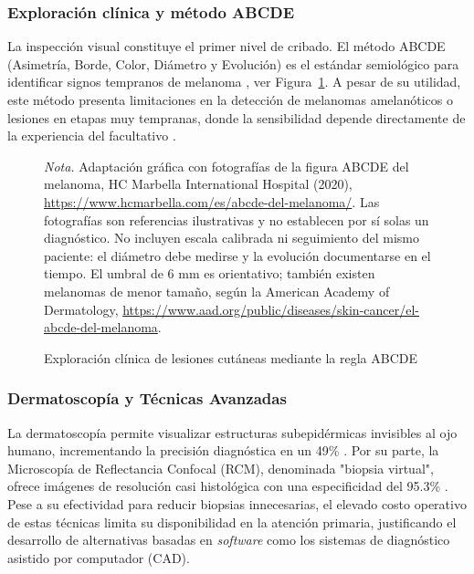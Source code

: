 \subsubsection{Exploración clínica y método ABCDE}

La inspección visual constituye el primer nivel de cribado. El método ABCDE (Asimetría, Borde, Color, Diámetro y Evolución) es el estándar semiológico para identificar signos tempranos de melanoma \parencite{ligacancer2024abcde}, ver Figura~\ref{fig:original-2}. A pesar de su utilidad, este método presenta limitaciones en la detección de melanomas amelanóticos o lesiones en etapas muy tempranas, donde la sensibilidad depende directamente de la experiencia del facultativo \parencite{niklitschek2025abcde}.

\begin{figure}[!htbp]
\caption{Exploración clínica de lesiones cutáneas mediante la regla ABCDE}
\label{fig:original-2}
\centering
    
\par\smallskip
\raggedright\footnotesize
\textit{Nota.} Adaptación gráfica con fotografías de la figura ABCDE del melanoma, HC Marbella International Hospital (2020), \url{https://www.hcmarbella.com/es/abcde-del-melanoma/}. Las fotografías son referencias ilustrativas y no establecen por sí solas un diagnóstico. No incluyen escala calibrada ni seguimiento del mismo paciente: el diámetro debe medirse y la evolución documentarse en el tiempo. El umbral de 6 mm es orientativo; también existen melanomas de menor tamaño, según la American Academy of Dermatology, \url{https://www.aad.org/public/diseases/skin-cancer/el-abcde-del-melanoma}.
\end{figure}



\subsubsection{Dermatoscopía y Técnicas Avanzadas}

La dermatoscopía permite visualizar estructuras subepidérmicas invisibles al ojo humano, incrementando la precisión diagnóstica en un 49\% \parencite{santavelez2020dermatoscopia}. Por su parte, la Microscopía de Reflectancia Confocal (RCM), denominada "biopsia virtual", ofrece imágenes de resolución casi histológica con una especificidad del 95.3\% \parencite{fundacionpielsana2024confocal}. Pese a su efectividad para reducir biopsias innecesarias, el elevado costo operativo de estas técnicas limita su disponibilidad en la atención primaria, justificando el desarrollo de alternativas basadas en \textit{software} como los sistemas de diagnóstico asistido por computador (CAD).

